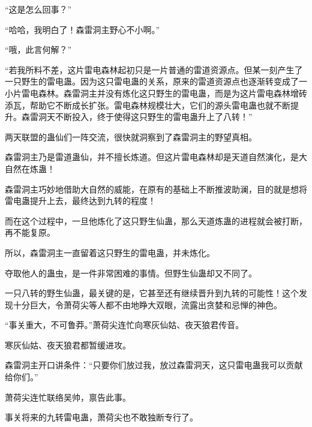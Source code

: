 \begin{this_body}
“这是怎么回事？”

“哈哈，我明白了！森雷洞主野心不小啊。”

“哦，此言何解？”

“若我所料不差，这片雷电森林起初只是一片普通的雷道资源点。但某一刻产生了一只野生的雷电蛊。因为这只雷电蛊的关系，原来的雷道资源点也逐渐转变成了一小片雷电森林。森雷洞主并没有炼化这只野生的雷电蛊，而是为这片雷电森林增砖添瓦，帮助它不断成长扩张。雷电森林规模壮大，它们的源头雷电蛊也就不断提升。森雷洞天不断投入，终于使得这只野生的雷电蛊升上了八转！”

两天联盟的蛊仙们一阵交流，很快就洞察到了森雷洞主的野望真相。

森雷洞主乃是雷道蛊仙，并不擅长炼道。但这片雷电森林却是天道自然演化，是大自然在炼蛊！

森雷洞主巧妙地借助大自然的威能，在原有的基础上不断推波助澜，目的就是想将雷电蛊提升上去，最终达到九转的程度！

而在这个过程中，一旦他炼化了这只野生仙蛊，那么天道炼蛊的进程就会被打断，再不能复原。

所以，森雷洞主一直留着这只野生的雷电蛊，并未炼化。

夺取他人的蛊虫，是一件非常困难的事情。但野生仙蛊却又不同了。

一只八转的野生仙蛊，最关键的是，它甚至还有继续晋升到九转的可能性！这个发现十分巨大，令萧荷尖等人都不由地睁大双眼，流露出贪婪和忌惮的神色。

“事关重大，不可鲁莽。”萧荷尖连忙向寒灰仙姑、夜天狼君传音。

寒灰仙姑、夜天狼君都暂缓进攻。

森雷洞主开口讲条件：“只要你们放过我，放过森雷洞天，这只雷电蛊我可以贡献给你们。”

萧荷尖连忙联络吴帅，禀告此事。

事关将来的九转雷电蛊，萧荷尖也不敢独断专行了。

\end{this_body}


